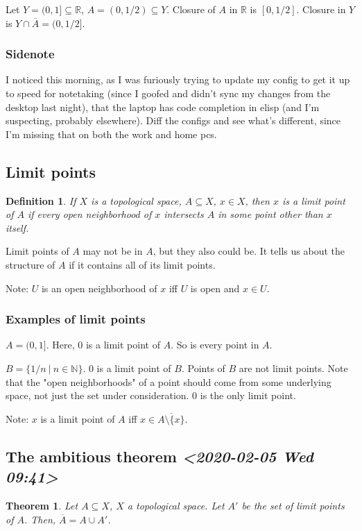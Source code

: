 \documentclass[11pt]{article}
\newtheorem{theorem}{Theorem}[section]
\newtheorem{definition}{Definition}[section]
\begin{document}
Let \(Y = (0,1] \subseteq \mathbb{R}\), \(A = (0, 1/2) \subseteq
Y\). Closure of \(A\) in \(\mathbb{R}\) is \([0,1/2]\). Closure in \(Y\) is
\(Y\cap \overline{A} = (0,1/2]\).

\subsubsection{Sidenote}
\label{sec:org8ecfc72}
I noticed this morning, as I was furiously trying to update my config
to get it up to speed for notetaking (since I goofed and didn't sync
my changes from the desktop last night), that the laptop has code
completion in elisp (and I'm suspecting, probably elsewhere). Diff the
configs and see what's different, since I'm missing that on both the
work and home pcs. 

\subsection{Limit points}
\label{sec:org8ee247d}
\begin{definition}
If \(X\) is a topological space, \(A\subseteq X\), \(x \in X\), then \(x\) is
a limit point of \(A\) if every open neighborhood of \(x\) intersects \(A\)
in some point other than \(x\) itself. 
\end{definition}

Limit points of \(A\) may not be in \(A\), but they also could be. It
tells us about the structure of \(A\) if it contains all of its limit
points.

Note: \(U\) is an open neighborhood of \(x\) iff \(U\) is open and \(x \in
U\).

\subsubsection{Examples of limit points}
\label{sec:org694e85e}
\(A = (0,1]\). Here, 0 is a limit point of \(A\). So is every point in
\(A\).

\(B= \{ 1/n\ |\ n\in\mathbb{N}\}\). 0 is a limit point of \(B\). Points of
\(B\) are not limit points. Note that the "open neighborhoods" of a
point should come from some underlying space, not just the set under
consideration. 0 is the only limit point. 

Note: \(x\) is a limit point of \(A\) iff \(x \in
\overline{A\setminus\{x\}}\).

\subsection{The ambitious theorem \textit{<2020-02-05 Wed 09:41>}}
\label{sec:orgb1cdd7a}
\begin{theorem}
Let \(A \subseteq X\), \(X\) a topological space. Let \(A'\) be the set of
limit points of \(A\). Then, \(\overline{A} = A\cup A'\).
\end{theorem}
\end{document}
